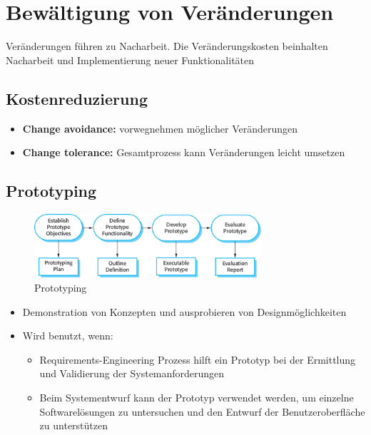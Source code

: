 \section{Bewältigung von Veränderungen}
Veränderungen führen zu Nacharbeit. Die Veränderungskosten beinhalten Nacharbeit und Implementierung neuer Funktionalitäten
\subsection{Kostenreduzierung}
\begin{itemize}
    \item \textbf{Change avoidance:} vorwegnehmen möglicher Veränderungen
    \item \textbf{Change tolerance:} Gesamtprozess kann Veränderungen leicht umsetzen
\end{itemize}
\subsection{Prototyping}
\begin{figure}[h]
    \centering
    \includegraphics[width=0.75\textwidth]{mainmatter/pics/prototyping.png}
    \caption{Prototyping}
\end{figure}
\begin{itemize}
    \item Demonstration von Konzepten und ausprobieren von Designmöglichkeiten
    \item Wird benutzt, wenn:
    \begin{itemize}
        \item Requirements-Engineering Prozess hilft ein Prototyp bei der Ermittlung und Validierung der Systemanforderungen
        \item Beim Systementwurf kann der Prototyp verwendet werden, um einzelne Softwarelösungen zu untersuchen und den Entwurf der Benutzeroberfläche zu unterstützen 
    \end{itemize}
\end{itemize}

\qquad\\
\qquad\\
